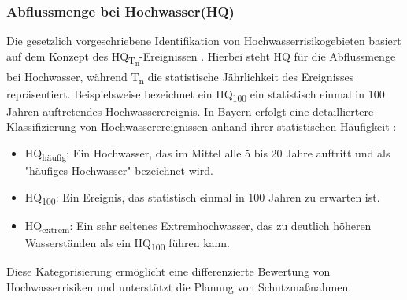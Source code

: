 \subsubsection{Abflussmenge bei Hochwasser(HQ)}\label{sec:HQ}
Die gesetzlich vorgeschriebene Identifikation von Hochwasserrisikogebieten basiert auf dem Konzept des HQ\textsubscript{T\textsubscript{n}}-Ereignissen \autocite{WHG73}. Hierbei steht HQ für die Abflussmenge bei Hochwasser, während T\textsubscript{n} die statistische Jährlichkeit des Ereignisses repräsentiert. Beispielsweise bezeichnet ein HQ\textsubscript{100} ein statistisch einmal in 100 Jahren auftretendes Hochwasserereignis.
In Bayern erfolgt eine detailliertere Klassifizierung von Hochwasserereignissen anhand ihrer statistischen Häufigkeit \autocite{BayLfU2019}:
\begin{itemize}
\item HQ\textsubscript{häufig}: Ein Hochwasser, das im Mittel alle 5 bis 20 Jahre auftritt und als "häufiges Hochwasser" bezeichnet wird.
\item HQ\textsubscript{100}: Ein Ereignis, das statistisch einmal in 100 Jahren zu erwarten ist.
\item HQ\textsubscript{extrem}: Ein sehr seltenes Extremhochwasser, das zu deutlich höheren Wasserständen als ein HQ\textsubscript{100} führen kann.
\end{itemize}
Diese Kategorisierung ermöglicht eine differenzierte Bewertung von Hochwasserrisiken und unterstützt die Planung von Schutzmaßnahmen.
